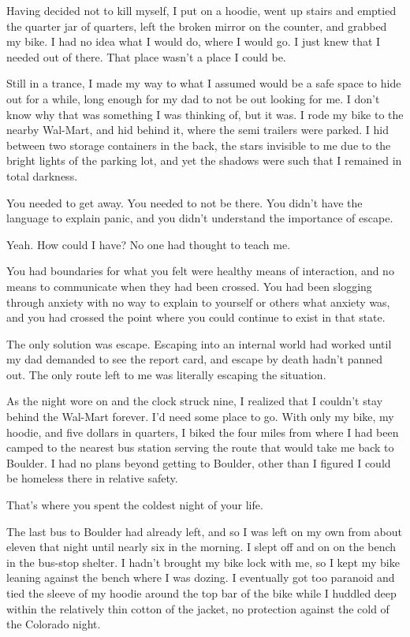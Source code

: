 \begin{paracol}{2}
\begin{leftcolumn}
Having decided not to kill myself, I put on a hoodie, went up stairs and emptied the quarter jar of quarters, left the broken mirror on the counter, and grabbed my bike. I had no idea what I would do, where I would go. I just knew that I needed out of there. That place wasn't a place I could be.

Still in a trance, I made my way to what I assumed would be a safe space to hide out for a while, long enough for my dad to not be out looking for me. I don't know why that was something I was thinking of, but it was. I rode my bike to the nearby Wal-Mart, and hid behind it, where the semi trailers were parked. I hid between two storage containers in the back, the stars invisible to me due to the bright lights of the parking lot, and yet the shadows were such that I remained in total darkness.

\begin{ally}
You needed to get away. You needed to not be there. You didn't have the language to explain panic, and you didn't understand the importance of escape.
\end{ally}
Yeah. How could I have? No one had thought to teach me.

\begin{ally}
You had boundaries for what you felt were healthy means of interaction, and no means to communicate when they had been crossed. You had been slogging through anxiety with no way to explain to yourself or others what anxiety was, and you had crossed the point where you could continue to exist in that state.
\end{ally}
The only solution was escape. Escaping into an internal world had worked until my dad demanded to see the report card, and escape by death hadn't panned out. The only route left to me was literally escaping the situation.

As the night wore on and the clock struck nine, I realized that I couldn't stay behind the Wal-Mart forever. I'd need some place to go. With only my bike, my hoodie, and five dollars in quarters, I biked the four miles from where I had been camped to the nearest bus station serving the route that would take me back to Boulder. I had no plans beyond getting to Boulder, other than I figured I could be homeless there in relative safety.

\begin{ally}
That's where you spent the coldest night of your life.
\end{ally}
The last bus to Boulder had already left, and so I was left on my own from about eleven that night until nearly six in the morning. I slept off and on on the bench in the bus-stop shelter. I hadn't brought my bike lock with me, so I kept my bike leaning against the bench where I was dozing. I eventually got too paranoid and tied the sleeve of my hoodie around the top bar of the bike while I huddled deep within the relatively thin cotton of the jacket, no protection against the cold of the Colorado night.


\end{leftcolumn}
\end{paracol}
